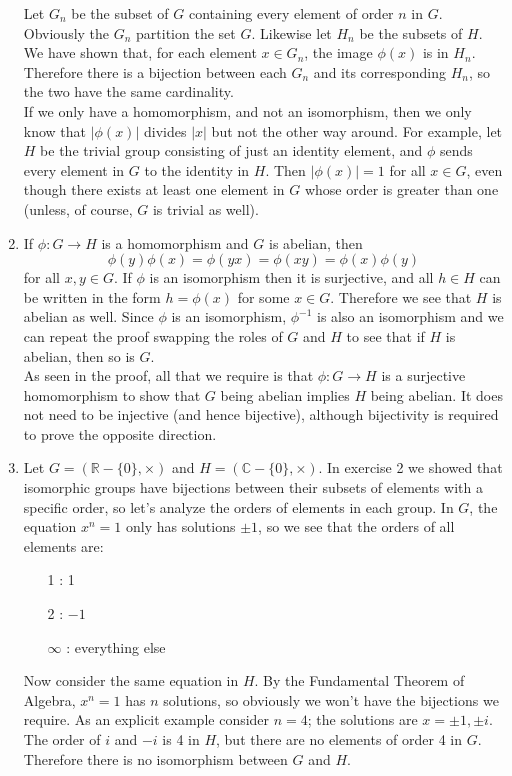 \documentclass[]{article}
\newcommand{\abs}[1]{\left\vert #1 \right\vert}
\newcommand{\bbr}{\mathbb{R}}
\newcommand{\bbc}{\mathbb{C}}
\begin{document}
\begin{enumerate}
Let $G_n$ be the subset of $G$ containing every element of order $n$ in $G$. Obviously the $G_n$ partition the set $G$. Likewise let $H_n$ be the subsets of $H$. We have shown that, for each element $x \in G_n$, the image $\phi(x)$ is in $H_n$. Therefore there is a bijection between each $G_n$ and its corresponding $H_n$, so the two have the same cardinality. \\

If we only have a homomorphism, and not an isomorphism, then we only know that $\abs{\phi(x)}$ divides $\abs{x}$ but not the other way around. For example, let $H$ be the trivial group consisting of just an identity element, and $\phi$ sends every element in $G$ to the identity in $H$. Then $\abs{\phi(x)} = 1$ for all $x \in G$, even though there exists at least one element in $G$ whose order is greater than one (unless, of course, $G$ is trivial as well).


\item If $\phi: G\to H$ is a homomorphism and $G$ is abelian, then
\begin{equation}
\phi(y)\phi(x) = \phi(yx) = \phi(xy) = \phi(x)\phi(y)
\end{equation}
for all $x,y\in G$. If $\phi$ is an isomorphism then it is surjective, and all $h \in H$ can be written in the form $h = \phi(x)$ for some $x \in G$. Therefore we see that $H$ is abelian as well. Since $\phi$ is an isomorphism, $\phi^{-1}$ is also an isomorphism and we can repeat the proof swapping the roles of $G$ and $H$ to see that if $H$ is abelian, then so is $G$. \\

As seen in the proof, all that we require is that $\phi: G \to H$ is a surjective homomorphism to show that $G$ being abelian implies $H$ being abelian. It does not need to be injective (and hence bijective), although bijectivity is required to prove the opposite direction.


\item Let $G = (\bbr - \{0\}, \times)$ and $H = (\bbc - \{0\}, \times)$. In exercise 2 we showed that isomorphic groups have bijections between their subsets of elements with a specific order, so let's analyze the orders of elements in each group. In $G$, the equation $x^n = 1$ only has solutions $\pm 1$, so we see that the orders of all elements are:
\begin{enumerate}
\item[1]: 1 
\item[2]: $-1$
\item[$\infty$]: everything else
\end{enumerate}
Now consider the same equation in $H$. By the Fundamental Theorem of Algebra, $x^n = 1$ has $n$ solutions, so obviously we won't have the bijections we require. As an explicit example consider $n=4$; the solutions are $x = \pm 1, \pm i$. The order of $i$ and $-i$ is 4 in $H$, but there are no elements of order 4 in $G$. Therefore there is no isomorphism between $G$ and $H$.



\end{enumerate}
\end{document}

